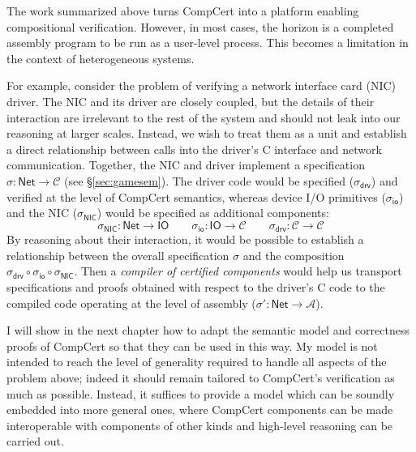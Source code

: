 \documentclass[11pt,oneside]{book}
\theoremstyle{definition}
\newcommand{\kw}[1]{\ensuremath{ \mathsf{#1} }}
\begin{document}
The work summarized above turns CompCert
into a platform enabling compositional verification.
However, in most cases,
the horizon is a completed assembly program to be run as a user-level process.
This becomes a limitation in the context of heterogeneous systems.

For example,
consider the problem of verifying
a network interface card (NIC) driver.
The NIC and its driver are closely coupled,
but the details of their interaction
are irrelevant to the rest of the system
and should not leak into our reasoning at larger scales.
Instead,
we wish to treat them as a unit
and establish a direct relationship between calls into
the driver's C interface and network communication.
Together, the NIC and driver implement
a specification $\sigma :
\kw{Net} \rightarrow \mathcal{C}$ (see \S\ref{sec:gamesem}). %
The driver code would be specified
($\sigma_\kw{drv}$)
and verified
at the level of CompCert semantics,
whereas device I/O primitives
($\sigma_\kw{io}$)
and the NIC
($\sigma_\kw{NIC}$)
would be specified as additional components:
\[
  \sigma_\kw{NIC} : \kw{Net} \rightarrow \kw{IO}
  \qquad
  \sigma_\kw{io} : \kw{IO} \rightarrow \mathcal{C}
  \qquad
  \sigma_\kw{drv} : \mathcal{C} \rightarrow \mathcal{C}
\]
By reasoning about their interaction,
it would be possible to establish a relationship between
the overall specification $\sigma$ and
the composition
$\sigma_\kw{drv} \circ \sigma_\kw{io} \circ \sigma_\kw{NIC}$.
Then a \emph{compiler of certified components}
would help us transport specifications and proofs
obtained with respect to the driver's C code
to the compiled code operating at the level of assembly
($\sigma' : \kw{Net} \rightarrow \mathcal{A}$).

I will show in the next chapter how to adapt
the semantic model and correctness proofs of CompCert
so that they can be used in this way.
My model is not intended to reach the level of generality
required to handle all aspects of the problem above;
indeed it should remain tailored to CompCert's
verification as much as possible.
Instead, it suffices to provide a model which can be
soundly embedded into more general ones,
where CompCert components can be made interoperable
with components of other kinds
and high-level reasoning can be carried out.
\end{document}
